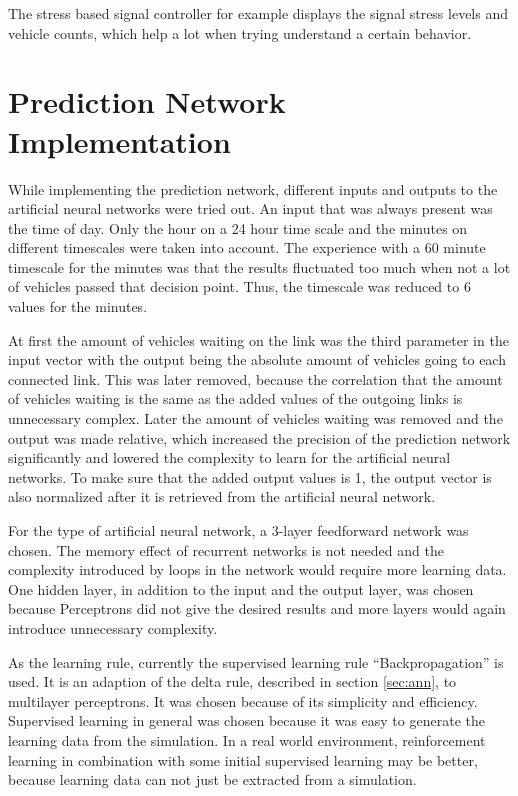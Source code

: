 The stress based signal controller for example displays the signal stress levels and vehicle counts, which help a lot when trying understand a certain behavior.

\section{Prediction Network Implementation}

While implementing the prediction network, different inputs and outputs to the artificial neural networks were tried out. An input that was always present was the time of day. Only the hour on a 24 hour time scale and the minutes on different timescales were taken into account. The experience with a 60 minute timescale for the minutes was that the results fluctuated too much when not a lot of vehicles passed that decision point. Thus, the timescale was reduced to 6 values for the minutes.

At first the amount of vehicles waiting on the link was the third parameter in the input vector with the output being the absolute amount of vehicles going to each connected link. This was later removed, because the correlation that the amount of vehicles waiting is the same as the added values of the outgoing links is unnecessary complex. Later the amount of vehicles waiting was removed and the output was made relative, which increased the precision of the prediction network significantly and lowered the complexity to learn for the artificial neural networks. To make sure that the added output values is 1, the output vector is also normalized after it is retrieved from the artificial neural network.

For the type of artificial neural network, a 3-layer feedforward network was chosen. The memory effect of recurrent networks is not needed and the complexity introduced by loops in the network would require more learning data. One hidden layer, in addition to the input and the output layer, was chosen because Perceptrons did not give the desired results and more layers would again introduce unnecessary complexity.

As the learning rule, currently the supervised learning rule ``Backpropagation'' is used. It is an adaption of the delta rule, described in section \ref{sec:ann}, to multilayer perceptrons. It was chosen because of its simplicity and efficiency. Supervised learning in general was chosen because it was easy to generate the learning data from the simulation. In a real world environment, reinforcement learning in combination with some initial supervised learning may be better, because learning data can not just be extracted from a simulation.

